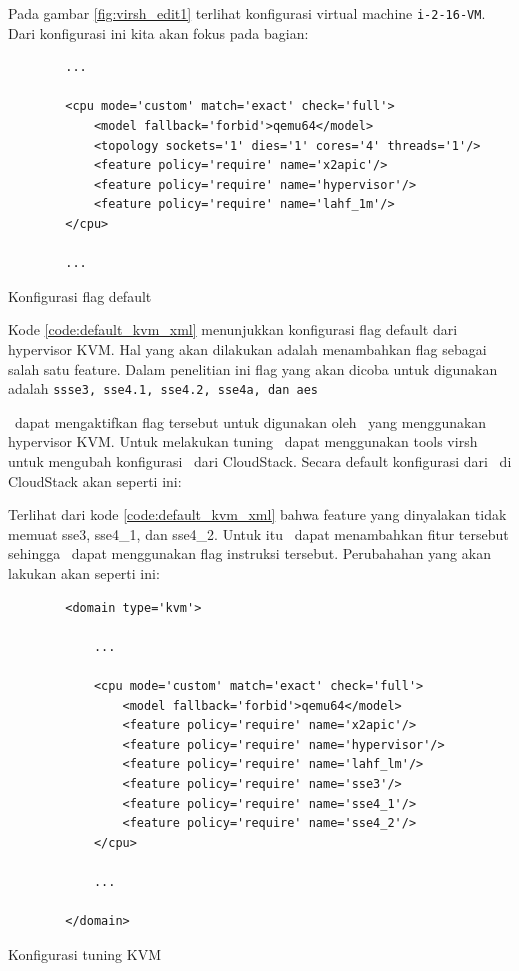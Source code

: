 Pada gambar \ref{fig:virsh_edit1} terlihat konfigurasi virtual machine \texttt{i-2-16-VM}. Dari konfigurasi ini kita akan fokus pada bagian:

\begin{listing}[H]
    \begin{verbatim}
        ...

        <cpu mode='custom' match='exact' check='full'>
            <model fallback='forbid'>qemu64</model>
            <topology sockets='1' dies='1' cores='4' threads='1'/>
            <feature policy='require' name='x2apic'/>
            <feature policy='require' name='hypervisor'/> 
            <feature policy='require' name='lahf_1m'/>
        </cpu>
        
        ...
    \end{verbatim}
    \caption{Konfigurasi flag default}
    \label{code:default_kvm_xml}
\end{listing}

Kode \ref{code:default_kvm_xml} menunjukkan konfigurasi flag default dari hypervisor KVM. Hal yang akan dilakukan adalah menambahkan flag sebagai salah satu feature. Dalam penelitian ini flag yang akan dicoba untuk digunakan adalah \texttt{ssse3, sse4.1, sse4.2, sse4a, dan aes}




\saya\ dapat mengaktifkan flag tersebut untuk digunakan oleh \vm\ yang menggunakan hypervisor KVM. Untuk melakukan tuning \saya\ dapat menggunakan tools virsh untuk mengubah konfigurasi \vm\ dari CloudStack. Secara default konfigurasi dari \vm\ di CloudStack akan seperti ini:



Terlihat dari kode \ref{code:default_kvm_xml} bahwa feature yang dinyalakan tidak memuat sse3, sse4\_1, dan sse4\_2. Untuk itu \saya\ dapat menambahkan fitur tersebut sehingga \vm\ dapat menggunakan flag instruksi tersebut. Perubahahan yang akan \saya lakukan akan seperti ini:

\begin{listing}[H]
    \begin{verbatim}
        <domain type='kvm'>
        
            ...
            
            <cpu mode='custom' match='exact' check='full'>
                <model fallback='forbid'>qemu64</model>
                <feature policy='require' name='x2apic'/>
                <feature policy='require' name='hypervisor'/>
                <feature policy='require' name='lahf_lm'/>
                <feature policy='require' name='sse3'/>
                <feature policy='require' name='sse4_1'/>
                <feature policy='require' name='sse4_2'/>
            </cpu>
            
            ...
            
        </domain>
    \end{verbatim}
    \caption{Konfigurasi tuning KVM}
    \label{code:tuned_kvm_xml}
\end{listing}

